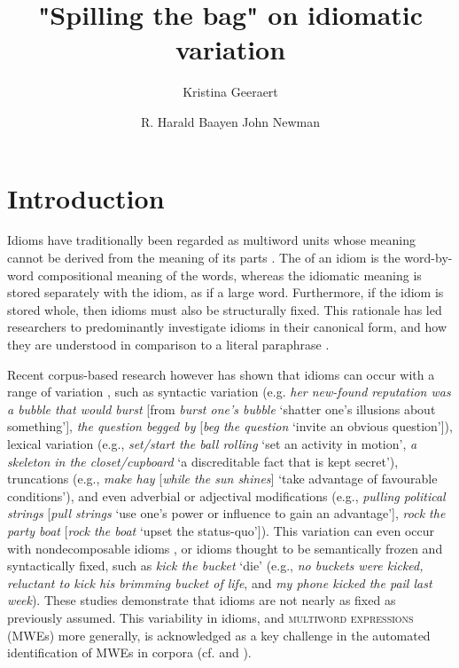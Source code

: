 \documentclass[output=paper
,modfonts
,nonflat]{langsci/langscibook}
\title{"Spilling the bag" on idiomatic variation}
\author{%
 Kristina Geeraert\affiliation{KU Leuven}\and 
 R. Harald Baayen\affiliation{University of T\"ubingen \& University of Alberta}\lastand 
 John Newman\affiliation{University of Alberta \& Monash University}
}
\begin{document}
\maketitle
\label{GEERAERT-CHAPTER}

\section{Introduction} 


Idioms have traditionally been regarded as multiword units whose meaning cannot be derived from the meaning of its parts \citep{BobrowBell1973}. The  of an idiom is the word-by-word compositional meaning of the words, whereas the idiomatic meaning is stored separately with the idiom, as if a large word. Furthermore, if the idiom is stored whole, then idioms must also be structurally fixed. This rationale has led researchers to predominantly investigate idioms in their canonical form, and how they are understood in comparison to a literal paraphrase \citep{SwinneyCutler1979, Gibbs1980, CacciariTabossi1988, TitoneConnine1999}.

Recent corpus-based research however has shown that idioms can occur with a range of variation \citep{Moon1998, Barlow2000, Langlotz2006, Schroder2013}, such as syntactic variation (e.g. \textit{her new-found reputation was a bubble that would burst} [from \textit{burst one's bubble} `shatter one's illusions about something'], \textit{the question begged by} [\textit{beg the question} `invite an obvious question']), lexical variation (e.g., \textit{set/start the ball rolling} `set an activity in motion', \textit{a skeleton in the closet/cupboard} `a discreditable fact that is kept secret'), truncations (e.g., \textit{make hay} [\textit{while the sun shines}] `take advantage of favourable conditions'), and even adverbial or adjectival modifications (e.g., \textit{pulling political strings} [\textit{pull strings} `use one's power or influence to gain an advantage'], \textit{rock the party boat} [\textit{rock the boat} `upset the status-quo']). This variation can even occur with nondecomposable idioms \citep{Duffley2013}, or idioms thought to be semantically frozen and syntactically fixed, such as \textit{kick the bucket} `die' (e.g., \textit{no buckets were kicked, reluctant to kick his brimming bucket of life}, and \textit{my phone kicked the pail last week}). These studies demonstrate that idioms are not nearly as fixed as previously assumed. This variability in idioms, and \textsc{multiword expressions} (MWEs) more generally, is acknowledged as a key challenge in the automated identification of MWEs in corpora (cf.   and  ).
\end{document}
